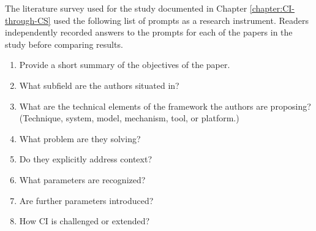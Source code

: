 \documentclass[../thesis.tex]{subfiles}
\begin{document}
 The literature survey used for the study documented in
 Chapter \ref{chapter:CI-through-CS} used the following
 list of prompts as a research instrument.
 Readers independently recorded answers to the prompts for each of
 the papers in the study before comparing results.

\bigskip

\begin{enumerate}
\item Provide a short summary of the
objectives of the paper.
\item What subfield are the authors
situated in?
\item What are the technical elements of
the framework the authors are proposing? (Technique, system, model,
mechanism, tool, or platform.)
\item What problem are they solving?
\item Do they explicitly address context?
\item What parameters are recognized?
\item Are further parameters introduced?
\item How CI is challenged or extended?
\end{enumerate}

\bigskip
\end{document}
